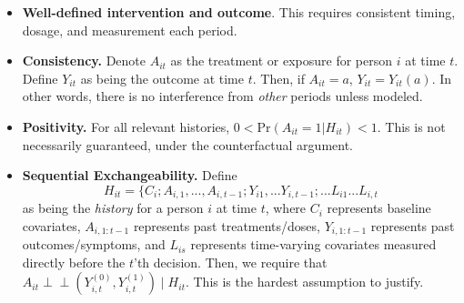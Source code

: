 \documentclass[12pt,letterpaper,doublespace, oneside]{article}
\begin{document}
\begin{itemize}

\item \textbf{Well-defined intervention and outcome}. This requires consistent timing, dosage, and measurement each period. 

\item \textbf{Consistency.} Denote $A_{it}$ as the treatment or exposure for person $i$ at time $t$. Define $Y_{it}$ as being the outcome at time $t$. Then, if $A_{it} = a$, $Y_{it} = Y_{it}(a)$. In other words, there is no interference from \emph{other} periods unless modeled. 

\item \textbf{Positivity.} For all relevant histories, $0 < \text{Pr}(A_{it} = 1| H_{it}) < 1$. This is not necessarily guaranteed, under the counterfactual argument. 

\item \textbf{Sequential Exchangeability.}  Define \[H_{it} = \{ C_i; A_{i,1}, ..., A_{i,t-1}; Y_{i1}, ... Y_{i, t-1}; ... L_{i1} ... L_{i,t}\] as being the \emph{history} for a person $i$ at time $t$, where $C_i$ represents baseline covariates, $A_{i, 1:t-1}$ represents past treatments/doses, $Y_{i, 1: t-1}$ represents past outcomes/symptoms, and $L_{is}$ represents time-varying covariates measured directly before the $t$'th decision. Then, we require that $A_{it} \perp\!\!\!\perp (Y_{i,t}^{(0)}, Y_{i,t}^{(1)}) \mid H_{it}$. This is the hardest assumption to justify. 

\end{itemize}

\end{document}
